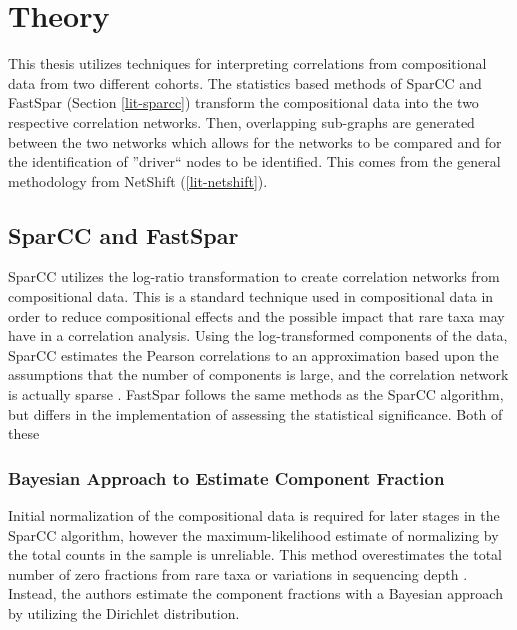 
\chapter{Theory}


This thesis utilizes techniques for interpreting correlations from compositional data from two different cohorts. The statistics based methods of \acrshort{SparCC} and \acrshort{FastSpar} (Section \ref{lit-sparcc}) transform the compositional data into the two respective correlation networks. Then, overlapping sub-graphs are generated between the two networks which allows for the networks to be compared and for the identification of ''driver`` nodes to be identified. This comes from the general methodology from NetShift (\ref{lit-netshift}).


\section{SparCC and FastSpar} \label{theory-sparcc}

\acrshort{SparCC} utilizes the log-ratio transformation to create correlation networks from compositional data. This is a standard technique used in compositional data in order to reduce compositional effects and the possible impact that rare taxa may have in a correlation analysis. Using the log-transformed components of the data, \acrshort{SparCC} estimates the Pearson correlations to an approximation based upon the assumptions that the number of components is large, and the correlation network is actually sparse \citep{Friedman2012}. \acrshort{FastSpar} follows the same methods as the \acrshort{SparCC} algorithm, but differs in the implementation of assessing the statistical significance. Both of these 

\subsection{Bayesian Approach to Estimate Component Fraction}\label{theory-bayes}
Initial normalization of the compositional data is required for later stages in the \acrshort{SparCC} algorithm, however the maximum-likelihood estimate of normalizing by the total counts in the sample is unreliable. This method overestimates the total number of zero fractions from rare taxa or variations in sequencing depth \citep{Agresti2005,Friedman2012}. Instead, the authors estimate the component fractions with a Bayesian approach by utilizing the Dirichlet distribution.

